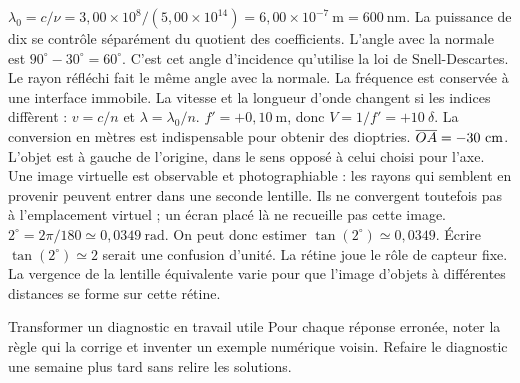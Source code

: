 $\lambda_0=c/\nu=3{,}00\times10^8/(5{,}00\times10^{14})=6{,}00\times10^{-7}\ \mathrm{m}=600\ \mathrm{nm}$. La puissance de dix se contrôle séparément du quotient des coefficients.
L'angle avec la normale est $90^\circ-30^\circ=60^\circ$. C'est cet angle d'incidence qu'utilise la loi de Snell-Descartes. Le rayon réfléchi fait le même angle avec la normale.
La fréquence est conservée à une interface immobile. La vitesse et la longueur d'onde changent si les indices diffèrent : $v=c/n$ et $\lambda=\lambda_0/n$.
$f'=+0{,}10\ \mathrm{m}$, donc $V=1/f'=+10\ \delta$. La conversion en mètres est indispensable pour obtenir des dioptries.
$\overline{OA}=-30\ \mathrm{cm}$. L'objet est à gauche de l'origine, dans le sens opposé à celui choisi pour l'axe.
Une image virtuelle est observable et photographiable : les rayons qui semblent en provenir peuvent entrer dans une seconde lentille. Ils ne convergent toutefois pas à l'emplacement virtuel ; un écran placé là ne recueille pas cette image.
$2^\circ=2\pi/180\simeq0{,}0349\ \mathrm{rad}$. On peut donc estimer $\tan(2^\circ)\simeq0{,}0349$. Écrire $\tan(2^\circ)\simeq2$ serait une confusion d'unité.
La rétine joue le rôle de capteur fixe. La vergence de la lentille équivalente varie pour que l'image d'objets à différentes distances se forme sur cette rétine.
\begin{methode}{Transformer un diagnostic en travail utile}
Pour chaque réponse erronée, noter la règle qui la corrige et inventer un exemple numérique voisin. Refaire le diagnostic une semaine plus tard sans relire les solutions.
\end{methode}

